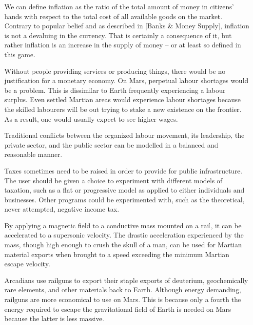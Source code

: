 We can define inflation as the ratio of the total amount of money in citizens' hands with respect to the total cost of all available goods on the market. Contrary to popular belief and as described in [Banks & Money Supply], inflation is not a devaluing in the currency. That is certainly a consequence of it, but rather inflation is an increase in the supply of money -- or at least so defined in this game.

Without people providing services or producing things, there would be no justification for a monetary economy. On Mars, perpetual labour shortages would be a problem. This is dissimilar to Earth frequently experiencing a labour surplus. Even settled Martian areas would experience labour shortages because the skilled labourers will be out trying to stake a new existence on the frontier. As a result, one would usually expect to see higher wages.

Traditional conflicts between the organized labour movement, its leadership, the private sector, and the public sector can be modelled in a balanced and reasonable manner.

Taxes sometimes need to be raised in order to provide for public infrastructure. The user should be given a choice to experiment with different models of taxation, such as a flat or progressive model as applied to either individuals and businesses. Other programs could be experimented with, such as the theoretical, never attempted, negative income tax.

By applying a magnetic field to a conductive mass mounted on a rail, it can be accelerated to a supersonic velocity. The drastic acceleration experienced by the mass, though high enough to crush the skull of a man, can be used for Martian material exports when brought to a speed exceeding the minimum Martian escape velocity.

    {}

Arcadians use railguns to export their staple exports of deuterium, geochemically rare elements, and other materials back to Earth. Although energy demanding, railguns are more economical to use on Mars. This is because only a fourth the energy required to escape the gravitational field of Earth is needed on Mars because the latter is less massive.

